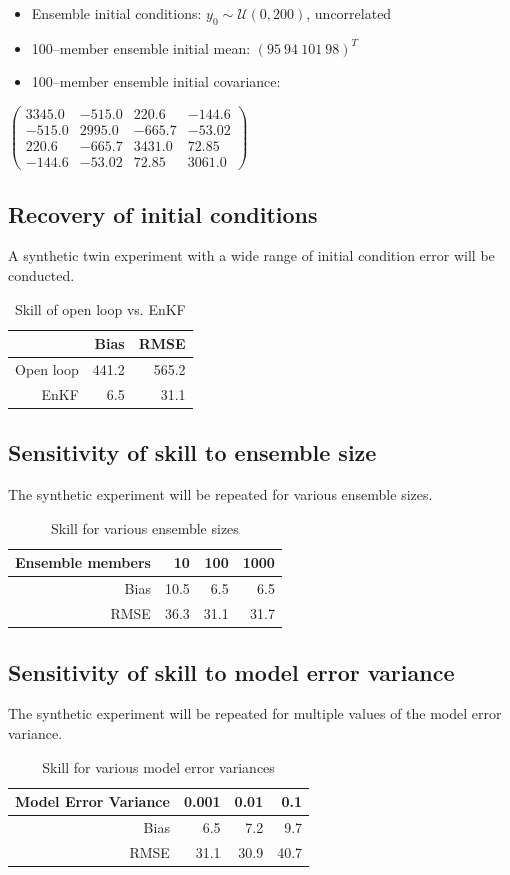 \documentclass[fleqn, letterpaper]{amsart}
\begin{document}
\begin{itemize}
\item Ensemble initial conditions: $y_0\sim\mathcal{U}(0,200)$, uncorrelated
\item 100--member ensemble initial mean: $(95\ 94\ 101\ 98)^T$
\item 100--member ensemble initial covariance:
\end{itemize}
$\left(\begin{array}{cccc} 3345.0 & -515.0 & 220.6 & -144.6\\ -515.0 & 2995.0 & -665.7 & -53.02\\ 220.6 & -665.7 & 3431.0 & 72.85\\ -144.6 & -53.02 & 72.85 & 3061.0 \end{array}\right)$

\subsection{Recovery of initial conditions}
 A synthetic twin experiment with a wide range of initial condition error will be conducted.
\begin{table}
\begin{tabular}{rrr}
& Bias & RMSE \\
\hline
Open loop & 441.2 & 565.2 \\
EnKF & 6.5 & 31.1
\end{tabular}
\caption{Skill of open loop vs. EnKF}
\end{table}

\subsection{Sensitivity of skill to ensemble size}
The synthetic experiment will be repeated for various ensemble sizes.
\begin{table}
\begin{tabular}{rrrr}
Ensemble members & 10 & 100 & 1000 \\
\hline
Bias & 10.5 & 6.5 & 6.5 \\
RMSE & 36.3 & 31.1 & 31.7
\end{tabular}
\caption{Skill for various ensemble sizes}
\end{table}

\subsection{Sensitivity of skill to model error variance}
The synthetic experiment will be repeated for multiple values of the model error variance.
\begin{table}
\begin{tabular}{rrrr}
Model Error Variance & 0.001 & 0.01 & 0.1 \\
\hline
Bias & 6.5 & 7.2 & 9.7\\
RMSE & 31.1 & 30.9 & 40.7
\end{tabular}
\caption{Skill for various model error variances}
\end{table}
\end{document}
